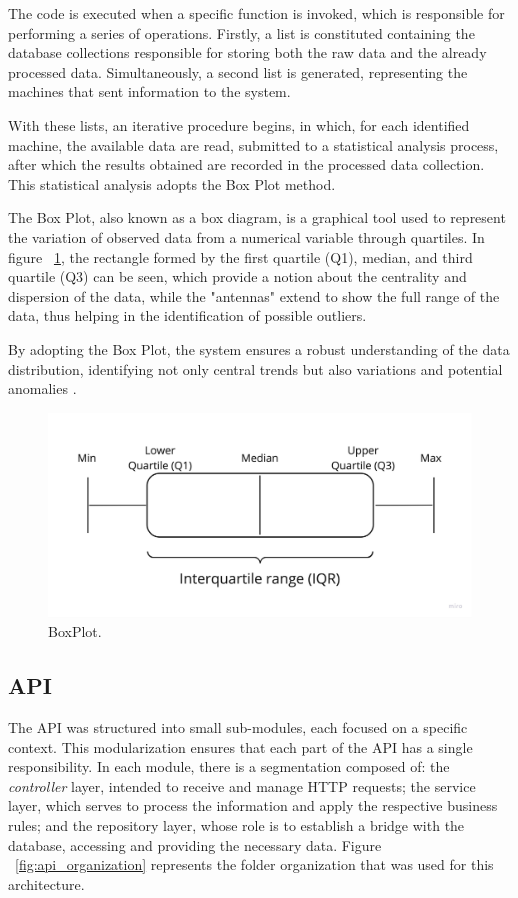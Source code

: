 The code is executed when a specific function is invoked, which is responsible for performing a series of operations. Firstly, a list is constituted containing the database collections responsible for storing both the raw data and the already processed data. Simultaneously, a second list is generated, representing the machines that sent information to the system.

With these lists, an iterative procedure begins, in which, for each identified machine, the available data are read, submitted to a statistical analysis process, after which the results obtained are recorded in the processed data collection. This statistical analysis adopts the Box Plot method.

The Box Plot, also known as a box diagram, is a graphical tool used to represent the variation of observed data from a numerical variable through quartiles. In figure ~\ref{fig:boxplot}, the rectangle formed by the first quartile (Q1), median, and third quartile (Q3) can be seen, which provide a notion about the centrality and dispersion of the data, while the "antennas" extend to show the full range of the data, thus helping in the identification of possible outliers.

By adopting the Box Plot, the system ensures a robust understanding of the data distribution, identifying not only central trends but also variations and potential anomalies \cite{marmolejo2010shifting}.

\begin{figure}[htbp]
	\centering
	\includegraphics[scale=0.1]{images/boxplot.jpg}
	\caption{BoxPlot.}
	\label{fig:boxplot}
\end{figure}


\subsection{API}\label{subsec:apiArchitecture}
The \gls{API} was structured into small sub-modules, each focused on a specific context. This modularization ensures that each part of the \gls{API} has a single responsibility. In each module, there is a segmentation composed of: the \textit{controller} layer, intended to receive and manage \gls{HTTP} requests; the service layer, which serves to process the information and apply the respective business rules; and the repository layer, whose role is to establish a bridge with the database, accessing and providing the necessary data. Figure ~\ref{fig:api_organization} represents the folder organization that was used for this architecture.

